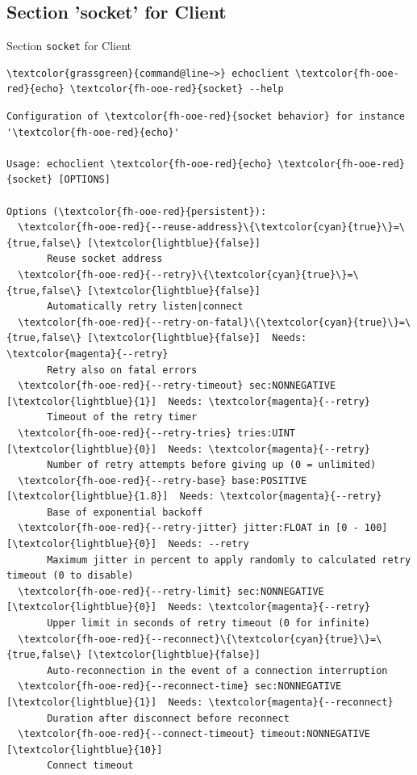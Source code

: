 \subsection{Section 'socket' for Client}

\begin{frame}[fragile]{Section \alert{\lstinline|socket|} for Client}
\begin{scriptsize}
\begin{Verbatim}[commandchars=\\\{\}]
\textcolor{grassgreen}{command@line~>} echoclient \textcolor{fh-ooe-red}{echo} \textcolor{fh-ooe-red}{socket} --help
\end{Verbatim}
\begin{Verbatim}[commandchars=\\\{\},frame=leftline]
Configuration of \textcolor{fh-ooe-red}{socket behavior} for instance '\textcolor{fh-ooe-red}{echo}'

Usage: echoclient \textcolor{fh-ooe-red}{echo} \textcolor{fh-ooe-red}{socket} [OPTIONS]

Options (\textcolor{fh-ooe-red}{persistent}):
  \textcolor{fh-ooe-red}{--reuse-address}\{\textcolor{cyan}{true}\}=\{true,false\} [\textcolor{lightblue}{false}]
       Reuse socket address
  \textcolor{fh-ooe-red}{--retry}\{\textcolor{cyan}{true}\}=\{true,false\} [\textcolor{lightblue}{false}]
       Automatically retry listen|connect
  \textcolor{fh-ooe-red}{--retry-on-fatal}\{\textcolor{cyan}{true}\}=\{true,false\} [\textcolor{lightblue}{false}]  Needs: \textcolor{magenta}{--retry}
       Retry also on fatal errors
  \textcolor{fh-ooe-red}{--retry-timeout} sec:NONNEGATIVE [\textcolor{lightblue}{1}]  Needs: \textcolor{magenta}{--retry}
       Timeout of the retry timer
  \textcolor{fh-ooe-red}{--retry-tries} tries:UINT [\textcolor{lightblue}{0}]  Needs: \textcolor{magenta}{--retry}
       Number of retry attempts before giving up (0 = unlimited)
  \textcolor{fh-ooe-red}{--retry-base} base:POSITIVE [\textcolor{lightblue}{1.8}]  Needs: \textcolor{magenta}{--retry}
       Base of exponential backoff
  \textcolor{fh-ooe-red}{--retry-jitter} jitter:FLOAT in [0 - 100] [\textcolor{lightblue}{0}]  Needs: --retry
       Maximum jitter in percent to apply randomly to calculated retry timeout (0 to disable)
  \textcolor{fh-ooe-red}{--retry-limit} sec:NONNEGATIVE [\textcolor{lightblue}{0}]  Needs: \textcolor{magenta}{--retry}
       Upper limit in seconds of retry timeout (0 for infinite)
  \textcolor{fh-ooe-red}{--reconnect}\{\textcolor{cyan}{true}\}=\{true,false\} [\textcolor{lightblue}{false}]
       Auto-reconnection in the event of a connection interruption
  \textcolor{fh-ooe-red}{--reconnect-time} sec:NONNEGATIVE [\textcolor{lightblue}{1}]  Needs: \textcolor{magenta}{--reconnect}
       Duration after disconnect before reconnect
  \textcolor{fh-ooe-red}{--connect-timeout} timeout:NONNEGATIVE [\textcolor{lightblue}{10}]
       Connect timeout
\end{Verbatim}
\end{scriptsize}
\end{frame}
